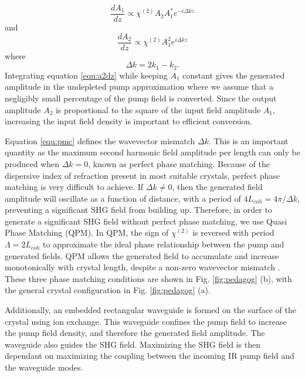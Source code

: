 \documentclass[9pt,twocolumn,twoside]{pnas-new}
\begin{document}
\begin{equation*} \label{equ:a1dz}
	\frac{d A_1}{dz} \propto \chi^{(2)} A_2 A_1^\ast e^{-i \Delta k z}
\end{equation*}
and
\begin{equation} \label{equ:a2dz}
	\frac{d A_2}{dz} \propto \chi^{(2)} A_1^2 e^{i \Delta k z}
\end{equation}
where
\begin{equation} \label{equ:pmc}
	\Delta k = 2k_1 - k_2.
\end{equation}
Integrating equation \ref{equ:a2dz} while keeping $A_1$ constant gives the generated amplitude in the undepleted pump approximation where we assume that a negligibly small percentage of the pump field is converted. Since the output amplitude $A_2$ is proportional to the square of the input field amplitude $A_1$, increasing the input field density is important to efficient conversion. 

Equation \ref{equ:pmc} defines the wavevector mismatch $\Delta k$. This is an important quantity as the maximum second harmonic field amplitude per length can only be produced when $\Delta k = 0$, known as perfect phase matching. Because of the dispersive index of refraction present in most suitable crystals, perfect phase matching is very difficult to achieve. If $\Delta k \neq 0$, then the generated field amplitude will oscillate as a function of distance, with a period of $4L_{coh} = 4 \pi / \Delta k$, preventing a significant SHG field from building up. Therefore, in order to generate a significant SHG field without perfect phase matching, we use Quasi Phase Matching (QPM). In QPM, the sign of $\chi^{(2)}$ is reversed with period $\Lambda = 2 L_{coh}$ to approximate the ideal phase relationship between the pump and generated fields. QPM allows the generated field to accumulate and increase monotonically with crystal length, despite a non-zero wavevector mismatch \cite{Suhara2003}. These three phase matching conditions are shown in Fig. \ref{fig:pedagog} (b), with the general crystal configuration in Fig. \ref{fig:pedagog} (a).

Additionally, an embedded rectangular waveguide is formed on the surface of the crystal using ion exchange. This waveguide confines the pump field to increase the pump field density, and therefore the generated field amplitude. The waveguide also guides the SHG field. Maximizing the SHG field is then dependant on maximizing the coupling between the incoming IR pump field and the waveguide modes.
	
\end{document}
